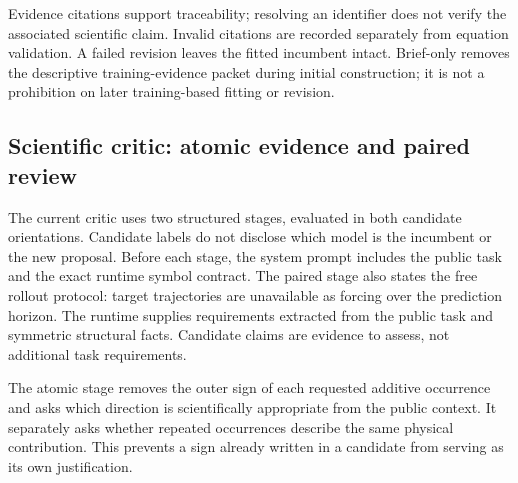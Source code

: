 Evidence citations support traceability; resolving an identifier does not verify
the associated scientific claim. Invalid citations are recorded separately from
equation validation. A failed revision leaves the fitted incumbent intact.
Brief-only removes the descriptive training-evidence packet during initial
construction; it is not a prohibition on later training-based fitting or revision.

\subsection{Scientific critic: atomic evidence and paired review}

The current critic uses two structured stages, evaluated in both candidate
orientations. Candidate labels do not disclose which model is the incumbent or
the new proposal. Before each stage, the system prompt includes the public task
and the exact runtime symbol contract. The paired stage also states the free
rollout protocol: target trajectories are unavailable as forcing over the
prediction horizon. The runtime supplies requirements extracted from the public
task and symmetric structural facts. Candidate claims are evidence to assess,
not additional task requirements.

The atomic stage removes the outer sign of each requested additive occurrence
and asks which direction is scientifically appropriate from the public context.
It separately asks whether repeated occurrences describe the same physical
contribution. This prevents a sign already written in a candidate from serving
as its own justification.

